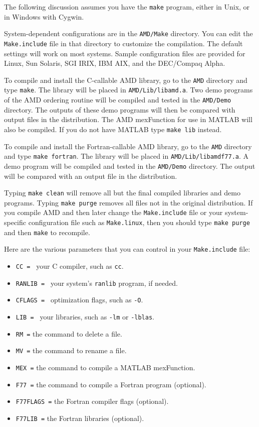 \documentclass[11pt]{article}
\begin{document}
The following discussion assumes you have the {\tt make} program, either in
Unix, or in Windows with Cygwin.

System-dependent configurations are in the {\tt AMD/Make}
directory.  You can edit the {\tt Make.include}
file in that directory to customize the compilation.  The default
settings will work on most systems.
Sample configuration files are provided
for Linux, Sun Solaris, SGI IRIX, IBM AIX, and the DEC/Compaq Alpha.

To compile and install the C-callable AMD library,
go to the {\tt AMD} directory and type {\tt make}.
The library will be placed in {\tt AMD/Lib/libamd.a}.
Two demo programs of the AMD ordering routine will be compiled and tested in
the {\tt AMD/Demo} directory.
The outputs of these demo programs will then be compared with output
files in the distribution.  The AMD mexFunction for
use in MATLAB will also be compiled.  If you do not have MATLAB
type {\tt make lib} instead.

To compile and install the Fortran-callable AMD library,
go to the {\tt AMD} directory and type {\tt make fortran}.
The library will be placed in {\tt AMD/Lib/libamdf77.a}.
A demo program will be compiled and tested in the {\tt AMD/Demo} directory.
The output will be compared with an output file in the distribution.

Typing {\tt make clean} will remove all but the final compiled libraries
and demo programs.  Typing {\tt make purge} removes all files not in the
original distribution.
If you compile AMD and then later change the {\tt Make.include}
file or your system-specific configuration file such as {\tt Make.linux},
then you should type {\tt make purge} and then {\tt make} to recompile.

Here are the various parameters that you can control in your
{\tt Make.include} file:

\begin{itemize}
\item {\tt CC = } your C compiler, such as {\tt cc}.
\item {\tt RANLIB = } your system's {\tt ranlib} program, if needed.
\item {\tt CFLAGS = } optimization flags, such as {\tt -O}.
\item {\tt LIB = } your libraries, such as {\tt -lm} or {\tt -lblas}.
\item {\tt RM =} the command to delete a file.
\item {\tt MV =} the command to rename a file.
\item {\tt MEX =} the command to compile a MATLAB mexFunction.
\item {\tt F77 =} the command to compile a Fortran program (optional).
\item {\tt F77FLAGS =} the Fortran compiler flags (optional).
\item {\tt F77LIB =} the Fortran libraries (optional).
\end{itemize}
\end{document}
